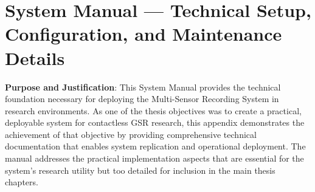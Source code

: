 \chapter{System Manual — Technical Setup, Configuration, and Maintenance Details}

\textbf{Purpose and Justification}: This System Manual provides the technical foundation necessary for deploying the Multi-Sensor Recording System in research environments. As one of the thesis objectives was to create a practical, deployable system for contactless GSR research, this appendix demonstrates the achievement of that objective by providing comprehensive technical documentation that enables system replication and operational deployment. The manual addresses the practical implementation aspects that are essential for the system's research utility but too detailed for inclusion in the main thesis chapters.


